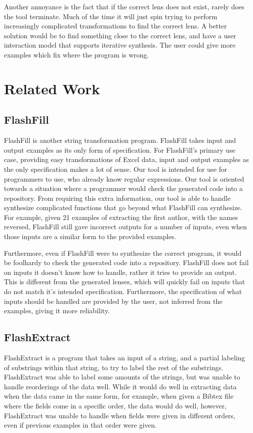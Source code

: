 \documentclass[numbers]{sigplanconf}
\begin{document}
Another annoyance is the fact that if the correct lens does not exist,
rarely does the tool terminate.  Much of the time it will just spin trying to
perform increasingly complicated transformations to find the correct lens.
A better solution would be to find something close to the correct lens, and have
a user interaction model that supports iterative synthesis.  The user could give
more examples which fix where the program is wrong.


\section{Related Work}
\subsection{FlashFill}
FlashFill is another string transformation program.  FlashFill takes input and
output examples as its only form of specification.  For FlashFill's primary use
case, providing easy transformations of Excel data, input and output examples as
the only specification makes a lot of sense.  Our tool is intended for use for
programmers to use, who already know regular expressions.  Our tool is oriented
towards a situation where a programmer would check the generated code into a
repository.  From requiring this extra information, our tool is able to handle
synthesize complicated functions that go beyond what FlashFill can synthesize.
For example, given 21 examples of extracting the first author, with the names
reversed, FlashFill still gave incorrect outputs for a number of inputs, even
when those inputs are a similar form to the provided examples.

Furthermore, even if FlashFill were to synthesize the correct program, it would
be foolhardy to check the generated code into a repository.  FlashFill does not
fail on inputs it doesn't know how to handle, rather it tries to provide an
output.  This is different from the generated lenses, which will quickly
fail on inputs that do not match it's intended specification.  Furthermore, the
specification of what inputs should be handled are provided by the user, not
inferred from the examples, giving it more reliability. 

\subsection{FlashExtract}
FlashExtract is a program that takes an input of a string, and a partial
labeling of substrings within that string, to try to label the rest of the
substrings.  FlashExtract was able to label some amounts of the strings, but was
unable to handle reorderings of the data well.  While it would do well in
extracting data when the data came in the same form, for example, when given a
Bibtex file where the fields come in a specific order, the data would do well,
however, FlashExtract was unable to handle when fields were given in different
orders, even if previous examples in that order were given.
\end{document}
